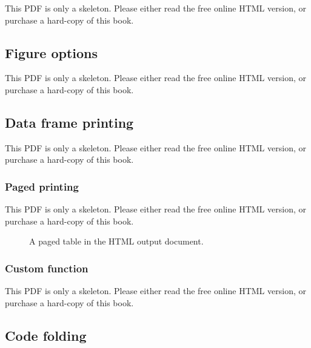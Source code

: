 \documentclass[
  11pt,
]{krantz}
\theoremstyle{definition}
\theoremstyle{definition}
\theoremstyle{definition}
\theoremstyle{definition}
\theoremstyle{remark}
\begin{document}
This PDF is only a skeleton. Please either read the free online HTML version, or purchase a hard-copy of this book.

\subsection{Figure options}\label{figure-options}

This PDF is only a skeleton. Please either read the free online HTML version, or purchase a hard-copy of this book.

\subsection{Data frame printing}\label{data-frame-printing}

This PDF is only a skeleton. Please either read the free online HTML version, or purchase a hard-copy of this book.

\begin{table}\caption{\label{tab:df-print} The possible values of the \texttt{df\_print} option for the \texttt{html\_document} format.}\end{table}

\subsubsection{Paged printing}\label{paged-printing}

This PDF is only a skeleton. Please either read the free online HTML version, or purchase a hard-copy of this book.

\begin{figure}\caption{A paged table in the HTML output document.}\end{figure}

\begin{table}\caption{\label{tab:paged} The options for paged HTML tables.}\end{table}

\subsubsection{Custom function}\label{custom-fun-dfprint}

This PDF is only a skeleton. Please either read the free online HTML version, or purchase a hard-copy of this book.

\subsection{Code folding}\label{code-folding}
\end{document}

